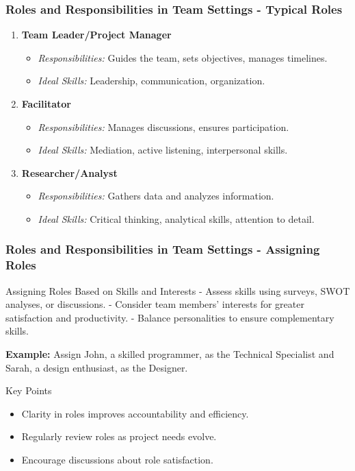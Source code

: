 \documentclass[aspectratio=169]{beamer}
\begin{document}
\begin{frame}[fragile]
    \frametitle{Roles and Responsibilities in Team Settings - Typical Roles}
    \begin{enumerate}
        \item \textbf{Team Leader/Project Manager}
            \begin{itemize}
                \item \textit{Responsibilities:} Guides the team, sets objectives, manages timelines.
                \item \textit{Ideal Skills:} Leadership, communication, organization.
            \end{itemize}
        
        \item \textbf{Facilitator}
            \begin{itemize}
                \item \textit{Responsibilities:} Manages discussions, ensures participation.
                \item \textit{Ideal Skills:} Mediation, active listening, interpersonal skills.
            \end{itemize}
        
        \item \textbf{Researcher/Analyst}
            \begin{itemize}
                \item \textit{Responsibilities:} Gathers data and analyzes information.
                \item \textit{Ideal Skills:} Critical thinking, analytical skills, attention to detail.
            \end{itemize}
    \end{enumerate}
\end{frame}

\begin{frame}[fragile]
    \frametitle{Roles and Responsibilities in Team Settings - Assigning Roles}
    \begin{block}{Assigning Roles Based on Skills and Interests}
        - Assess skills using surveys, SWOT analyses, or discussions.
        - Consider team members' interests for greater satisfaction and productivity.
        - Balance personalities to ensure complementary skills.
        
        \textbf{Example:} Assign John, a skilled programmer, as the Technical Specialist and Sarah, a design enthusiast, as the Designer.
    \end{block}
    
    \begin{block}{Key Points}
        \begin{itemize}
            \item Clarity in roles improves accountability and efficiency.
            \item Regularly review roles as project needs evolve.
            \item Encourage discussions about role satisfaction.
        \end{itemize}
    \end{block}
\end{frame}
\end{document}
